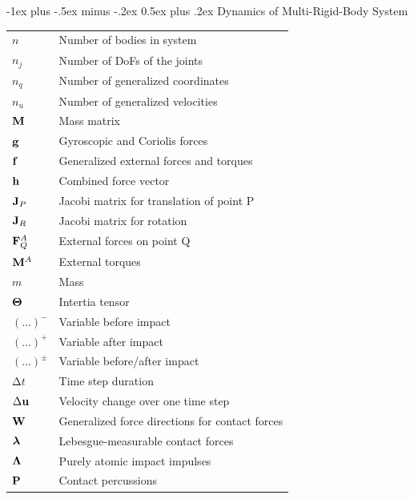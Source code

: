 \documentclass[10pt,landscape,a4paper]{article}
\makeatletter
\renewcommand{\section}{\@startsection{section}{1}{0mm}%
                                {-1ex plus -.5ex minus -.2ex}%
                                {0.5ex plus .2ex}%
                                {\normalfont\large\bfseries}}
\makeatother
\begin{document}
\begin{multicols}{2}
\section{Dynamics of Multi-Rigid-Body System}

\begin{tabular}{@{}ll@{}}
  $n$			& Number of bodies in system \\
  $n_j$ 		& Number of DoFs of the joints \\
  $n_q$ 		& Number of generalized coordinates \\
  $n_u$ 		& Number of generalized velocities \\
  $\mathbf M$			& Mass matrix \\
  $\mathbf g$			& Gyroscopic and Coriolis forces \\
  $\mathbf f$			& Generalized external forces and torques \\
  $\mathbf h$			& Combined force vector \\
  $\mathbf J_P$		& Jacobi matrix for translation of point P \\
  $\mathbf J_{R}$		& Jacobi matrix for rotation \\
  $\mathbf F_Q^A$		& External forces on point Q \\
  $\mathbf M^A$		& External torques \\
  $m$ 			& Mass \\
  $\mathbf \Theta$ 		& Intertia tensor \\
  $(...)^-$		& Variable before impact \\
  $(...)^+$		& Variable after impact \\
  $(...)^\pm$		& Variable before/after impact \\
  $\mathrm{\Delta} t$	& Time step duration \\
  $\mathrm{\Delta} \mathbf u$	& Velocity change over one time step \\
  $\mathbf W$			& Generalized force directions for contact forces \\
  $\mbox{\boldmath $\lambda$}$		& Lebesgue-measurable contact forces \\
  $\mathbf \Lambda$		& Purely atomic impact impulses \\
  $\mathbf P$			& Contact percussions \\
\end{tabular}



\end{multicols}
\end{document}
